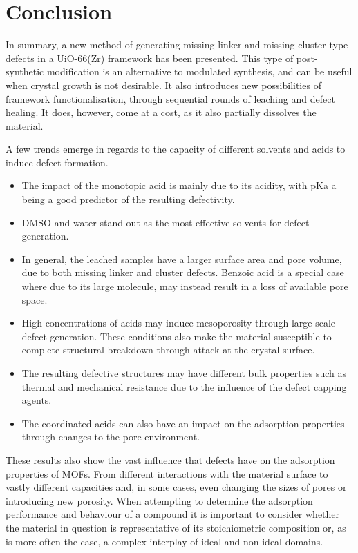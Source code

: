 
\FloatBarrier%
\pagebreak

\section{Conclusion}

In summary, a new method of generating missing linker and missing
cluster type defects in a UiO-66(Zr) framework has been presented.
This type of post-synthetic modification is an alternative to 
modulated synthesis, and can be useful when crystal growth is
not desirable. It also introduces new possibilities of framework
functionalisation, through sequential rounds of leaching and 
defect healing. It does, however, come at a cost, as it also 
partially dissolves the material.

A few trends emerge in regards to the capacity of different solvents 
and acids to induce defect formation.

\begin{itemize}
    \item The impact of the monotopic acid is mainly due to its 
    acidity, with pKa a being a good predictor of the 
    resulting defectivity.
    \item DMSO and water stand out as the most effective solvents
    for defect generation.
    \item In general, the leached samples have a larger surface 
    area and pore volume, due to both missing linker and cluster
    defects. Benzoic acid is a special case where 
    due to its large molecule, may instead result in a loss of
    available pore space.
    \item High concentrations of acids may induce mesoporosity
    through large-scale defect generation. These conditions also
    make the material susceptible to complete 
    structural breakdown through attack at the crystal surface.
    \item The resulting defective structures may have different 
    bulk properties such as thermal and mechanical resistance due 
    to the influence of the defect capping agents.
    \item The coordinated acids can also have an impact on the
    adsorption properties through changes to the pore environment.

\end{itemize}

These results also show the vast influence that defects have on the 
adsorption properties of MOFs. From different interactions with 
the material surface to vastly different capacities and, in some 
cases, even changing the sizes of pores or introducing new porosity.
When attempting to determine the adsorption performance and behaviour
of a compound it is important to consider whether the material in 
question is representative of its stoichiometric composition or,
as is more often the case, a complex interplay of ideal and 
non-ideal domains.

\pagebreak
